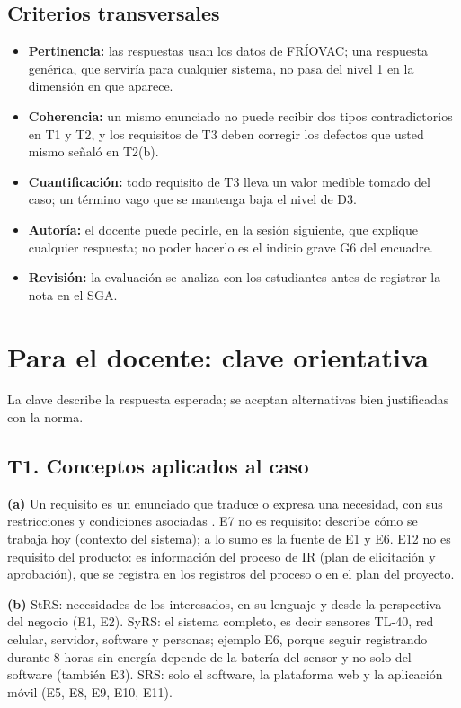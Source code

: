 \documentclass[11pt]{article}
\newif\ifclave
\newcommand{\seccion}[1]{\section{\textcolor{utegreendk}{#1}}}
\newcommand{\subseccion}[1]{\subsection{\textcolor{midblue}{#1}}}
\begin{document}
\subseccion{Criterios transversales}

\begin{itemize}[leftmargin=18pt,itemsep=2pt]
	\item \textbf{Pertinencia:} las respuestas usan los datos de FRÍOVAC; una respuesta genérica, que serviría para cualquier sistema, no pasa del nivel 1 en la dimensión en que aparece.
	\item \textbf{Coherencia:} un mismo enunciado no puede recibir dos tipos contradictorios en T1 y T2, y los requisitos de T3 deben corregir los defectos que usted mismo señaló en T2(b).
	\item \textbf{Cuantificación:} todo requisito de T3 lleva un valor medible tomado del caso; un término vago que se mantenga baja el nivel de D3.
	\item \textbf{Autoría:} el docente puede pedirle, en la sesión siguiente, que explique cualquier respuesta; no poder hacerlo es el indicio grave G6 del encuadre.
	\item \textbf{Revisión:} la evaluación se analiza con los estudiantes antes de registrar la nota en el SGA.
\end{itemize}

\ifclave
\newpage
\seccion{Para el docente: clave orientativa}

La clave describe la respuesta esperada; se aceptan alternativas bien justificadas con la norma.

\subseccion{T1. Conceptos aplicados al caso}

\textbf{(a)} Un requisito es un enunciado que traduce o expresa una necesidad, con sus restricciones y condiciones asociadas \citep{iso29148_2018}. E7 no es requisito: describe cómo se trabaja hoy (contexto del sistema); a lo sumo es la fuente de E1 y E6. E12 no es requisito del producto: es información del proceso de IR (plan de elicitación y aprobación), que se registra en los registros del proceso o en el plan del proyecto.

\textbf{(b)} StRS: necesidades de los interesados, en su lenguaje y desde la perspectiva del negocio (E1, E2). SyRS: el sistema completo, es decir sensores TL-40, red celular, servidor, software y personas; ejemplo E6, porque seguir registrando durante 8 horas sin energía depende de la batería del sensor y no solo del software (también E3). SRS: solo el software, la plataforma web y la aplicación móvil (E5, E8, E9, E10, E11).
\end{document}
